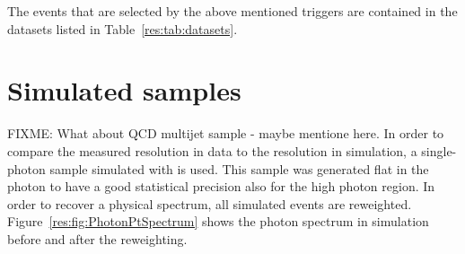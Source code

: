 The events that are selected by the above mentioned triggers are contained in the datasets listed in Table~\ref{res:tab:datasets}.
\renewcommand{\arraystretch}{1.5}
\begin{table}[!hbt]
\centering
\caption{Single-photon data samples used for the resolution measurement with the contained integrated luminosity.}
\label{res:tab:datasets}
\end{table}  

\section{Simulated samples}
\label{res:sec:SimulatedSamples}

FIXME: What about QCD multijet sample -  maybe mentione here.
In order to compare the measured resolution in data to the resolution in simulation, a single-photon sample simulated with \pythiaSix is used.
This sample was generated flat in the photon \pt to have a good statistical precision also for the high photon \pt region.
In order to recover a physical \pt spectrum, all simulated events are reweighted.
Figure~\ref{res:fig:PhotonPtSpectrum} shows the photon \pt spectrum in simulation before and after the reweighting. 

